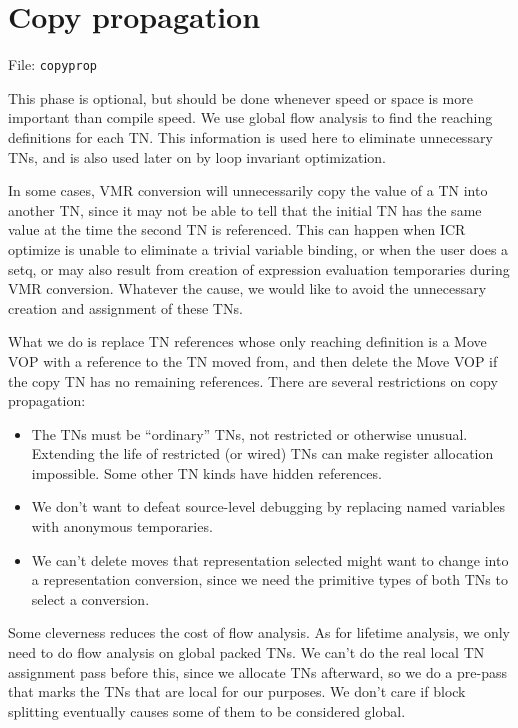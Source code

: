 
\chapter{Copy propagation}

File: {\tt copyprop}

This phase is optional, but should be done whenever speed or space is more
important than compile speed.  We use global flow analysis to find the reaching
definitions for each TN.  This information is used here to eliminate
unnecessary TNs, and is also used later on by loop invariant optimization.

In some cases, VMR conversion will unnecessarily copy the value of a TN into
another TN, since it may not be able to tell that the initial TN has the same
value at the time the second TN is referenced.  This can happen when ICR
optimize is unable to eliminate a trivial variable binding, or when the user
does a setq, or may also result from creation of expression evaluation
temporaries during VMR conversion.  Whatever the cause, we would like to avoid
the unnecessary creation and assignment of these TNs.

What we do is replace TN references whose only reaching definition is a Move
VOP with a reference to the TN moved from, and then delete the Move VOP if the
copy TN has no remaining references.  There are several restrictions on copy
propagation:
\begin{itemize}
\item The TNs must be ``ordinary'' TNs, not restricted or otherwise
unusual.  Extending the life of restricted (or wired) TNs can make register
allocation impossible.  Some other TN kinds have hidden references.

\item We don't want to defeat source-level debugging by replacing named
variables with anonymous temporaries.

\item We can't delete moves that representation selected might want to change
into a representation conversion, since we need the primitive types of both TNs
to select a conversion.
\end{itemize}

Some cleverness reduces the cost of flow analysis.  As for lifetime analysis,
we only need to do flow analysis on global packed TNs.  We can't do the real
local TN assignment pass before this, since we allocate TNs afterward, so we do
a pre-pass that marks the TNs that are local for our purposes.  We don't care
if block splitting eventually causes some of them to be considered global.

